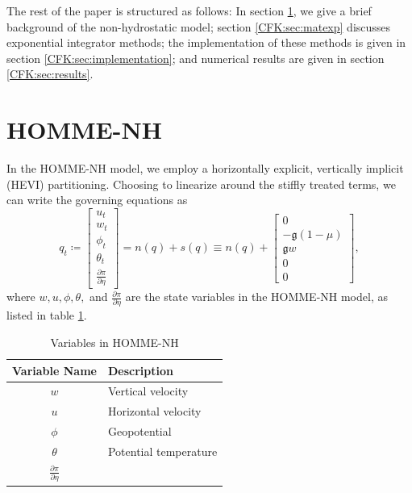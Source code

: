 \documentclass{csri19}
\newcommand{\CFKg}{\mathfrak{g}}
\begin{document}
The rest of the paper is structured as follows: In section 
\ref{CFK:sec:homme}, we give a brief background of the non-hydrostatic 
model; section \ref{CFK:sec:matexp} discusses exponential integrator 
methods; the implementation of these methods is given in section 
\ref{CFK:sec:implementation}; and numerical results are given in section 
\ref{CFK:sec:results}.

\section{HOMME-NH}\label{CFK:sec:homme}
In the HOMME-NH model, we employ a horizontally explicit, vertically 
implicit (HEVI) partitioning. Choosing to linearize around the stiffly 
treated terms, we can write the governing equations as
\[q_t \coloneqq \begin{bmatrix} u_t \\
w_t\\
\phi_t\\
\theta_t\\
\frac{\partial \pi}{\partial \eta}
\end{bmatrix} = n(q) + s(q) \equiv n(q) + \begin{bmatrix}
0\\
-\CFKg (1-\mu)\\
\CFKg w\\
0\\
0\end{bmatrix},\] 
where $w, u,\phi, \theta,$ and $\frac{\partial \pi}{\partial \eta}$ are the
 state variables in the HOMME-NH model, as listed in table \ref{CFK:tab:variables}.

\begin{table}
  \caption{Variables in HOMME-NH}
  \label{CFK:tab:variables}
  \begin{center}
    \begin{tabular}{|c|l|}
      \hline
      \textbf{Variable Name} & \textbf{Description} \\
      \hline
      $w$                                & Vertical velocity      \\
      $u$                                & Horizontal velocity    \\
      $\phi$                             & Geopotential           \\
      $\theta$                           & Potential temperature  \\
      $\frac{\partial\pi}{\partial\eta}$ &                        \\
      \hline
    \end{tabular}
  \end{center}
\end{table}
\end{document}
